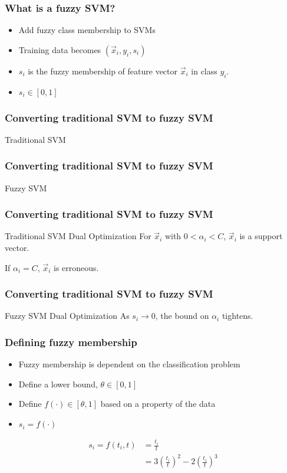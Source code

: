 
\begin{frame}
    \frametitle{What is a fuzzy SVM? \cite{991432}}
    \begin{itemize}
        \item Add fuzzy class membership to SVMs
        \item Training data becomes \(\left(\vec{x}_i, y_i, s_i\right)\)
        \item \(s_i\) is the fuzzy membership of feature vector \(\vec{x}_i\) in class \(y_i\).
        \item \(s_i \in [0, 1]\)
    \end{itemize}
\end{frame}

\begin{frame}
    \frametitle{Converting traditional SVM to fuzzy SVM}
    Traditional SVM
    \svmEquation
\end{frame}

\begin{frame}
    \frametitle{Converting traditional SVM to fuzzy SVM}
    Fuzzy SVM
    \fuzzySvmEquation
\end{frame}

\begin{frame}
    \frametitle{Converting traditional SVM to fuzzy SVM}
    Traditional SVM Dual Optimization
    \traditionalDual
    For \(\vec{x}_i\) with \(0 < \alpha_i < C\), \(\vec{x}_i\) is a support vector.

    If \(\alpha_i = C\), \(\vec{x}_i\) is erroneous.
\end{frame}

\begin{frame}
    \frametitle{Converting traditional SVM to fuzzy SVM}
    Fuzzy SVM Dual Optimization
    \fuzzyDual
    As \(s_i \to 0\), the bound on \(\alpha_i\) tightens.
\end{frame}

\begin{frame}
    \frametitle{Defining fuzzy membership}
    \begin{itemize}
        \item Fuzzy membership is dependent on the classification problem
        \item Define a lower bound, \(\theta \in [0, 1]\)
        \item Define \(f(\cdot) \in [\theta, 1]\) based on a property of the data
        \item \(s_i = f(\cdot)\)
    \end{itemize}
\end{frame}

\note
{
    \begin{align}
        s_i = f(t_i, t) &= \frac{t_i}{t} \\
        &= 3\left(\frac{t_i}{t}\right)^2 - 2\left(\frac{t_i}{t}\right)^3
    \end{align}
}
